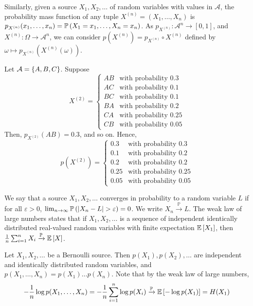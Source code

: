 Similarly, given a source \( X_1, X_2, \dots \) of random variables with values in \( \mathcal A \), the probability mass function of any tuple \( X^{(n)} = (X_1, \dots, X_n) \) is \( p_{X^{(n)}}(x_1, \dots, x_n) = \mathbb{P}\left({X_1 = x_1, \dots, X_n = x_n}\right) \).
As \( p_{X^{(n)}} \colon \mathcal A^n \to [0,1] \), and \( X^{(n)} \colon \Omega \to \mathcal A^n \), we can consider \( p(X^{(n)}) = p_{X^{(n)}} \circ X^{(n)} \) defined by \( \omega \mapsto p_{X^{(n)}}(X^{(n)}(\omega)) \).
\begin{example}
    Let \( \mathcal A = \qty{A, B, C} \).
    Suppose
    \[ X^{(2)} = \begin{cases}
        AB & \text{with probability } 0.3 \\
        AC & \text{with probability } 0.1 \\
        BC & \text{with probability } 0.1 \\
        BA & \text{with probability } 0.2 \\
        CA & \text{with probability } 0.25 \\
        CB & \text{with probability } 0.05
    \end{cases} \]
    Then, \( p_{X^{(2)}}(AB) = 0.3 \), and so on.
    Hence,
    \[ p(X^{(2)}) = \begin{cases}
        0.3 & \text{with probability } 0.3 \\
        0.1 & \text{with probability } 0.2 \\
        0.2 & \text{with probability } 0.2 \\
        0.25 & \text{with probability } 0.25 \\
        0.05 & \text{with probability } 0.05
    \end{cases} \]
\end{example}
We say that a source \( X_1,X_2, \dots \) converges in probability to a random variable \( L \) if for all \( \varepsilon > 0 \), \( \lim_{n \to \infty} \mathbb{P}\left({\abs{X_n - L} > \varepsilon}\right) = 0 \).
We write \( X_n \xrightarrow{\mathbb P} L \).
The weak law of large numbers states that if \( X_1, X_2, \dots \) is a sequence of independent identically distributed real-valued random variables with finite expectation \( \mathbb{E}\left[{X_1}\right] \), then \( \frac{1}{n} \sum_{i=1}^n X_i \xrightarrow{\mathbb P} \mathbb{E}\left[{X}\right] \).
\begin{example}
    Let \( X_1, X_2, \dots \) be a Bernoulli source.
    Then \( p(X_1), p(X_2), \dots \) are independent and identically distributed random variables, and \( p(X_1, \dots, X_n) = p(X_1) \dots p(X_n) \).
    Note that by the weak law of large numbers,
    \[ -\frac{1}{n} \log p(X_1, \dots, X_n) = -\frac{1}{n} \sum_{i=1}^n \log p(X_i) \xrightarrow{\mathbb P} \mathbb{E}\left[{-\log p(X_1)}\right] = H(X_1) \]
\end{example}
